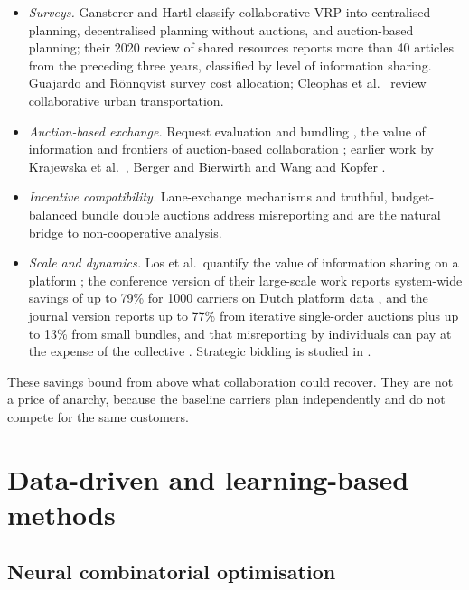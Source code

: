 \documentclass[preprint,12pt]{elsarticle}
\begin{document}
\begin{itemize}[leftmargin=*]
\item \emph{Surveys.} Gansterer and Hartl \cite{GanstererHartl2018} classify collaborative VRP into centralised planning, decentralised planning without auctions, and auction-based planning; their 2020 review of shared resources \cite{GanstererHartl2020top} reports more than 40 articles from the preceding three years, classified by level of information sharing. Guajardo and R{\"o}nnqvist \cite{Guajardo2016} survey cost allocation; Cleophas et al.\ \cite{Cleophas2019} review collaborative urban transportation.
\item \emph{Auction-based exchange.} Request evaluation and bundling \cite{GanstererHartl2016}, the value of information \cite{Gansterer2020ijpe} and frontiers of auction-based collaboration \cite{GanstererHartl2020omega}; earlier work by Krajewska et al.\ \cite{Krajewska2008}, Berger and Bierwirth \cite{Berger2010} and Wang and Kopfer \cite{WangKopfer2014}.
\item \emph{Incentive compatibility.} Lane-exchange mechanisms \cite{Ozener2011} and truthful, budget-balanced bundle double auctions \cite{Xu2017} address misreporting and are the natural bridge to non-cooperative analysis.
\item \emph{Scale and dynamics.} Los et al.\ quantify the value of information sharing on a platform \cite{Los2020tre}; the conference version of their large-scale work reports system-wide savings of up to 79\% for 1000 carriers on Dutch platform data \cite{Los2020iccl}, and the journal version reports up to 77\% from iterative single-order auctions plus up to 13\% from small bundles, and that misreporting by individuals can pay at the expense of the collective \cite{Los2025}. Strategic bidding is studied in \cite{Los2022lc}.
\end{itemize}
These savings bound from above what collaboration could recover. They are not a price of anarchy, because the baseline carriers plan independently and do not compete for the same customers.

\section{Data-driven and learning-based methods}\label{sec:learning}

\subsection{Neural combinatorial optimisation}
\end{document}
